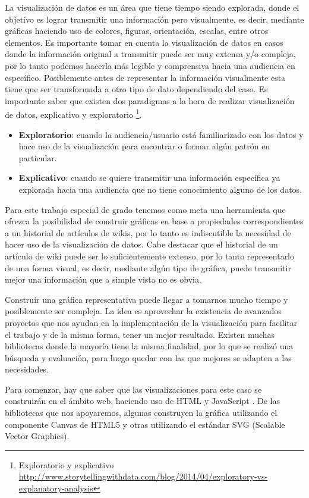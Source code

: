 La visualización de datos es un área que tiene tiempo siendo explorada, donde el objetivo es lograr transmitir una información pero visualmente, es decir, mediante gráficas haciendo uso de colores, figuras, orientación, escalas, entre otros elementos. Es importante tomar en cuenta la visualización de datos en casos donde la información original a transmitir puede ser muy extensa y/o compleja, por lo tanto podemos hacerla más legible y comprensiva hacia una audiencia en específico. Posiblemente antes de representar la información visualmente esta tiene que ser transformada a otro tipo de dato dependiendo del caso. Es importante saber que existen dos paradigmas a la hora de realizar visualización de datos, explicativo y exploratorio \footnote{Exploratorio y explicativo \url{http://www.storytellingwithdata.com/blog/2014/04/exploratory-vs-explanatory-analysis}}.
\begin{itemize}
\item\textbf{Exploratorio}: cuando la audiencia/usuario está familiarizado con los datos y hace uso de la visualización para encontrar o formar algún patrón en particular.

\item\textbf{Explicativo}: cuando se quiere transmitir una información específica ya explorada hacia una audiencia que no tiene conocimiento alguno de los datos.
\end{itemize}
Para este trabajo especial de grado tenemos como meta una herramienta que ofrezca la posibilidad de construir gráficas en base a propiedades correspondientes a un historial de artículos de wikis, por lo tanto es indiscutible la necesidad de hacer uso de la visualización de datos. Cabe destacar que el historial de un artículo de wiki puede ser lo suficientemente extenso, por lo tanto representarlo de una forma visual, es decir, mediante algún tipo de gráfica, puede transmitir mejor una información que a simple vista no es obvia.

Construir una gráfica representativa puede llegar a tomarnos mucho tiempo y posiblemente ser compleja. La idea es aprovechar la existencia de avanzados proyectos que nos ayudan en la implementación de la visualización para facilitar el trabajo y de la misma forma, tener un mejor resultado. Existen muchas bibliotecas donde la mayoría tiene la misma finalidad, por lo que se realizó una búsqueda y evaluación, para luego quedar con las que mejores se adapten a las necesidades.

Para comenzar, hay que saber que las visualizaciones para este caso se construirán en el ámbito web, haciendo uso de HTML \cite{MozHTML} y JavaScript \cite{MozJS}. De las bibliotecas que nos apoyaremos, algunas construyen la gráfica utilizando el componente Canvas \cite{MozCanvas} de HTML5 y otras utilizando el estándar SVG \cite{W3SVG} (Scalable Vector Graphics).
\\[10pt]
